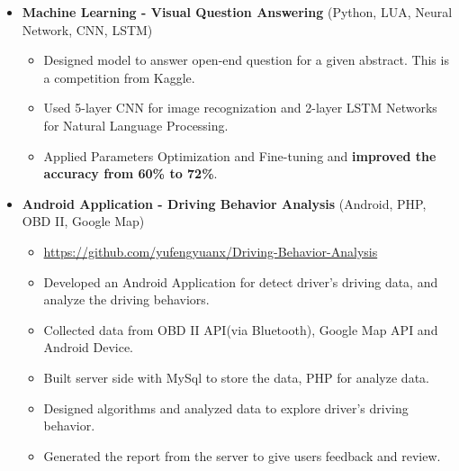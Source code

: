 \documentclass[letterpaper,10pt]{article}
\newcommand{\webSiteLink}[2]{#1\hspace{0.3em} \href{#2}{#2}}
\begin{document}
\begin{itemize}
	
	\item [] \textbf{Machine Learning - Visual Question Answering} (Python, LUA, Neural Network, CNN, LSTM)
	\setlength\itemsep{0em}
	\begin{itemize}[topsep=-1em]
	\setlength\itemindent{-0.25in}  %
	\setlength\itemsep{-0.1em} %
		\item [\textbullet]Designed model to answer open-end question for a given abstract. This is a competition from Kaggle.
		\item [\textbullet]Used 5-layer CNN for image recognization and 2-layer LSTM Networks for Natural Language Processing.
		\item [\textbullet]Applied Parameters Optimization and Fine-tuning and \textbf{improved the accuracy from 60\% to 72\%}.
	\end{itemize}
	
	
		
	
	\item [] \textbf{Android Application -  Driving Behavior Analysis} (Android, PHP, OBD II, Google Map)
	\setlength\itemsep{0em}
	
	\begin{itemize}[topsep=-1em]
	\setlength\itemindent{-0.25in}  %
	\setlength\itemsep{-0.1em} %
		\item [] \webSiteLink{\faGithub} {https://github.com/yufengyuanx/Driving-Behavior-Analysis}
		\item [\textbullet]Developed an Android Application for detect driver\rq s driving data, and analyze the driving behaviors.
		\item [\textbullet]Collected data from OBD II API(via Bluetooth), Google Map API and Android Device. 
		\item [\textbullet]Built server side with MySql to store the data, PHP for analyze data.
		\item [\textbullet]Designed algorithms and analyzed data to explore driver\rq s driving behavior.
		\item [\textbullet]Generated the report from the server to give users feedback and review.
	\end{itemize}
	
	
	

\end{itemize}
\end{document}
